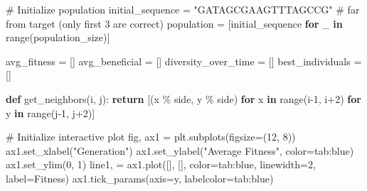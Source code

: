 \documentclass[
  letterpaper,
  DIV=11,
  numbers=noendperiod]{scrreprt}
\newenvironment{Shaded}{\begin{snugshade}}{\end{snugshade}}
\newcommand{\BuiltInTok}[1]{\textcolor[rgb]{0.00,0.23,0.31}{#1}}
\newcommand{\CommentTok}[1]{\textcolor[rgb]{0.37,0.37,0.37}{#1}}
\newcommand{\ControlFlowTok}[1]{\textcolor[rgb]{0.00,0.23,0.31}{\textbf{#1}}}
\newcommand{\DecValTok}[1]{\textcolor[rgb]{0.68,0.00,0.00}{#1}}
\newcommand{\KeywordTok}[1]{\textcolor[rgb]{0.00,0.23,0.31}{\textbf{#1}}}
\newcommand{\NormalTok}[1]{\textcolor[rgb]{0.00,0.23,0.31}{#1}}
\newcommand{\OperatorTok}[1]{\textcolor[rgb]{0.37,0.37,0.37}{#1}}
\newcommand{\StringTok}[1]{\textcolor[rgb]{0.13,0.47,0.30}{#1}}
\theoremstyle{definition}
\theoremstyle{remark}
\begin{document}
\begin{tcolorbox}
\begin{Shaded}
\begin{Highlighting}[]
\CommentTok{\# Initialize population}
\NormalTok{initial\_sequence }\OperatorTok{=} \StringTok{"GATAGCGAAGTTTAGCCG"} \CommentTok{\# far from target (only first 3 are correct)}
\NormalTok{population }\OperatorTok{=}\NormalTok{ [initial\_sequence }\ControlFlowTok{for}\NormalTok{ \_ }\KeywordTok{in} \BuiltInTok{range}\NormalTok{(population\_size)]}

\NormalTok{avg\_fitness }\OperatorTok{=}\NormalTok{ []}
\NormalTok{avg\_beneficial }\OperatorTok{=}\NormalTok{ []}
\NormalTok{diversity\_over\_time }\OperatorTok{=}\NormalTok{ []}
\NormalTok{best\_individuals }\OperatorTok{=}\NormalTok{ []}

\KeywordTok{def}\NormalTok{ get\_neighbors(i, j):}
    \ControlFlowTok{return}\NormalTok{ [(x }\OperatorTok{\%}\NormalTok{ side, y }\OperatorTok{\%}\NormalTok{ side)}
            \ControlFlowTok{for}\NormalTok{ x }\KeywordTok{in} \BuiltInTok{range}\NormalTok{(i}\OperatorTok{{-}}\DecValTok{1}\NormalTok{, i}\OperatorTok{+}\DecValTok{2}\NormalTok{)}
            \ControlFlowTok{for}\NormalTok{ y }\KeywordTok{in} \BuiltInTok{range}\NormalTok{(j}\OperatorTok{{-}}\DecValTok{1}\NormalTok{, j}\OperatorTok{+}\DecValTok{2}\NormalTok{)]}

\CommentTok{\# Initialize interactive plot}
\NormalTok{fig, ax1 }\OperatorTok{=}\NormalTok{ plt.subplots(figsize}\OperatorTok{=}\NormalTok{(}\DecValTok{12}\NormalTok{, }\DecValTok{8}\NormalTok{))}
\NormalTok{ax1.set\_xlabel(}\StringTok{"Generation"}\NormalTok{)}
\NormalTok{ax1.set\_ylabel(}\StringTok{"Average Fitness"}\NormalTok{, color}\OperatorTok{=}\StringTok{\textquotesingle{}tab:blue\textquotesingle{}}\NormalTok{)}
\NormalTok{ax1.set\_ylim(}\DecValTok{0}\NormalTok{, }\DecValTok{1}\NormalTok{)}
\NormalTok{line1, }\OperatorTok{=}\NormalTok{ ax1.plot([], [], color}\OperatorTok{=}\StringTok{\textquotesingle{}tab:blue\textquotesingle{}}\NormalTok{, linewidth}\OperatorTok{=}\DecValTok{2}\NormalTok{, label}\OperatorTok{=}\StringTok{\textquotesingle{}Fitness\textquotesingle{}}\NormalTok{)}
\NormalTok{ax1.tick\_params(axis}\OperatorTok{=}\StringTok{\textquotesingle{}y\textquotesingle{}}\NormalTok{, labelcolor}\OperatorTok{=}\StringTok{\textquotesingle{}tab:blue\textquotesingle{}}\NormalTok{)}


\end{Highlighting}
\end{Shaded}
\end{tcolorbox}
\end{document}
